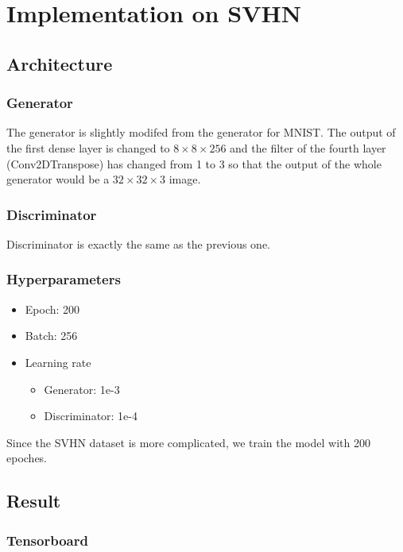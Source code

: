 \documentclass{article}
\begin{document}
\section{Implementation on SVHN}

\subsection{Architecture}

\subsubsection{Generator}

The generator is slightly modifed from the generator for MNIST. 
The output of the first dense layer is changed to $8\times 8\times 256$ 
and the filter of the fourth layer (Conv2DTranspose) has changed from 1 to 3
so that the output of the whole generator would be a $32\times 32\times 3$ image.

\subsubsection{Discriminator}

Discriminator is exactly the same as the previous one.

\subsubsection{Hyperparameters}

\begin{itemize}
  \item Epoch: 200
  \item Batch: 256
  \item Learning rate
    \begin{itemize}
      \item Generator: 1e-3
      \item Discriminator: 1e-4
    \end{itemize}
\end{itemize}

Since the SVHN dataset is more complicated, we train the model with 200 epoches.

\subsection{Result}

\subsubsection{Tensorboard}
\end{document}
